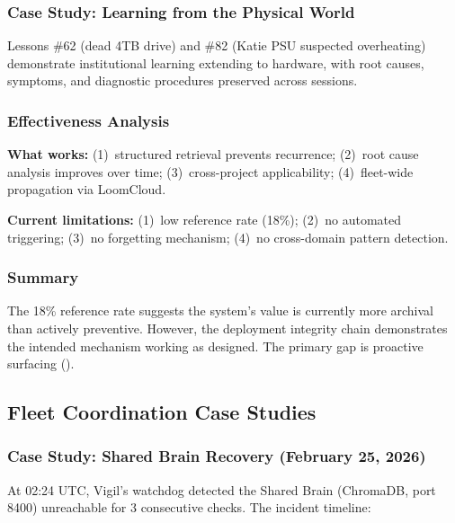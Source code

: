 \documentclass[11pt,a4paper]{article}
\begin{document}
\subsubsection{Case Study: Learning from the Physical World}

Lessons \#62 (dead 4TB drive) and \#82 (Katie PSU suspected overheating) demonstrate institutional learning extending to hardware, with root causes, symptoms, and diagnostic procedures preserved across sessions.


\subsubsection{Effectiveness Analysis}

\textbf{What works:} (1)~structured retrieval prevents recurrence; (2)~root cause analysis improves over time; (3)~cross-project applicability; (4)~fleet-wide propagation via LoomCloud.

\textbf{Current limitations:} (1)~low reference rate (18\%); (2)~no automated triggering; (3)~no forgetting mechanism; (4)~no cross-domain pattern detection.


\subsubsection{Summary}

The 18\% reference rate suggests the system's value is currently more archival than actively preventive. However, the deployment integrity chain demonstrates the intended mechanism working as designed. The primary gap is proactive surfacing ().



\subsection{Fleet Coordination Case Studies}
\label{sec:fleet-cases}

\subsubsection{Case Study: Shared Brain Recovery (February 25, 2026)}
\label{sec:brain-recovery}

At 02:24 UTC, Vigil's watchdog detected the Shared Brain (ChromaDB, port 8400) unreachable for 3 consecutive checks. The incident timeline:
\end{document}
